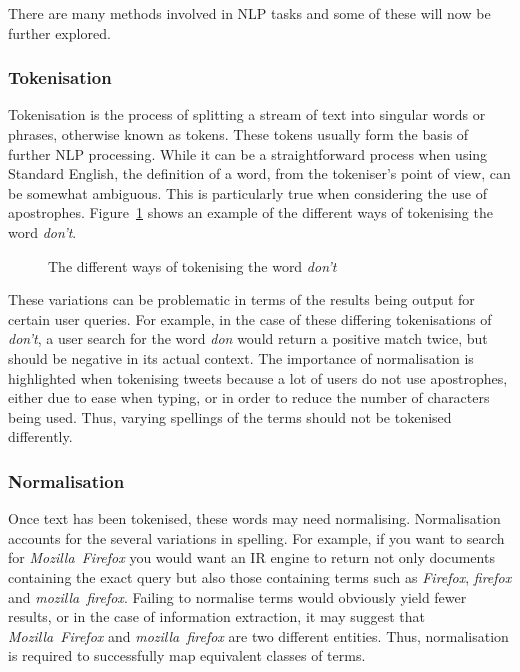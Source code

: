 There are many methods involved in NLP tasks and some of these will now be further explored.

\subsubsection{Tokenisation}
Tokenisation is the process of splitting a stream of text into singular words or phrases, otherwise known as tokens. These tokens usually form the basis of further NLP processing. While it can be a straightforward process when using Standard English, the definition of a word, from the tokeniser's point of view, can be somewhat ambiguous. This is particularly true when considering the use of apostrophes. Figure~\ref{fig:tokenisation} shows an example of the different ways of tokenising the word \emph{don't}.

\begin{figure}[h!]
  \centering
  
  \caption{The different ways of tokenising the word \emph{don't}
    \label{fig:tokenisation}}
\end{figure}

These variations can be problematic in terms of the results being output for certain user queries. For example, in the case of these differing tokenisations of \emph{don't}, a user search for the word \emph{don} would return a positive match twice, but should be negative in its actual context. The importance of normalisation is highlighted when tokenising tweets because a lot of users do not use apostrophes, either due to ease when typing, or in order to reduce the number of characters being used. Thus, varying spellings of the terms should not be tokenised differently.

\subsubsection{Normalisation}
Once text has been tokenised, these words may need normalising. Normalisation accounts for the several variations in spelling. For example, if you want to search for \emph{Mozilla~Firefox} you would want an IR engine to return not only documents containing the exact query but also those containing terms such as \emph{Firefox}, \emph{firefox} and \emph{mozilla~firefox}. Failing to normalise terms would obviously yield fewer results, or in the case of information extraction, it may suggest that \emph{Mozilla~Firefox} and \emph{mozilla~firefox} are two different entities. Thus, normalisation is required to successfully map equivalent classes of terms.

